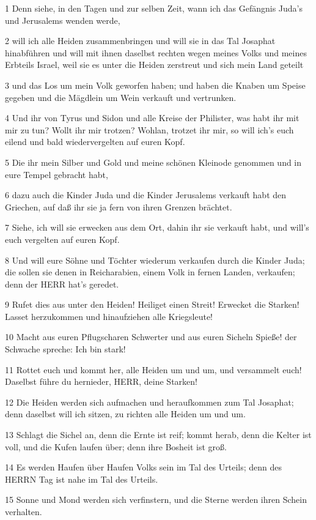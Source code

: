 \par 1 Denn siehe, in den Tagen und zur selben Zeit, wann ich das Gefängnis Juda's und Jerusalems wenden werde,
\par 2 will ich alle Heiden zusammenbringen und will sie in das Tal Josaphat hinabführen und will mit ihnen daselbst rechten wegen meines Volks und meines Erbteils Israel, weil sie es unter die Heiden zerstreut und sich mein Land geteilt
\par 3 und das Los um mein Volk geworfen haben; und haben die Knaben um Speise gegeben und die Mägdlein um Wein verkauft und vertrunken.
\par 4 Und ihr von Tyrus und Sidon und alle Kreise der Philister, was habt ihr mit mir zu tun? Wollt ihr mir trotzen? Wohlan, trotzet ihr mir, so will ich's euch eilend und bald wiedervergelten auf euren Kopf.
\par 5 Die ihr mein Silber und Gold und meine schönen Kleinode genommen und in eure Tempel gebracht habt,
\par 6 dazu auch die Kinder Juda und die Kinder Jerusalems verkauft habt den Griechen, auf daß ihr sie ja fern von ihren Grenzen brächtet.
\par 7 Siehe, ich will sie erwecken aus dem Ort, dahin ihr sie verkauft habt, und will's euch vergelten auf euren Kopf.
\par 8 Und will eure Söhne und Töchter wiederum verkaufen durch die Kinder Juda; die sollen sie denen in Reicharabien, einem Volk in fernen Landen, verkaufen; denn der HERR hat's geredet.
\par 9 Rufet dies aus unter den Heiden! Heiliget einen Streit! Erwecket die Starken! Lasset herzukommen und hinaufziehen alle Kriegsleute!
\par 10 Macht aus euren Pflugscharen Schwerter und aus euren Sicheln Spieße! der Schwache spreche: Ich bin stark!
\par 11 Rottet euch und kommt her, alle Heiden um und um, und versammelt euch! Daselbst führe du hernieder, HERR, deine Starken!
\par 12 Die Heiden werden sich aufmachen und heraufkommen zum Tal Josaphat; denn daselbst will ich sitzen, zu richten alle Heiden um und um.
\par 13 Schlagt die Sichel an, denn die Ernte ist reif; kommt herab, denn die Kelter ist voll, und die Kufen laufen über; denn ihre Bosheit ist groß.
\par 14 Es werden Haufen über Haufen Volks sein im Tal des Urteils; denn des HERRN Tag ist nahe im Tal des Urteils.
\par 15 Sonne und Mond werden sich verfinstern, und die Sterne werden ihren Schein verhalten.
